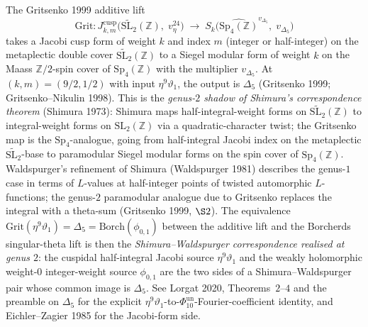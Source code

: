 \begin{remark}
\label{rem:k3e-gritsenko-shimura-shadow}
The Gritsenko 1999 additive lift
\[
 \mathrm{Grit}\colon
 J^{\mathrm{cusp}}_{k,m}\bigl(\widetilde{\mathrm{SL}_2}(\mathbb{Z}),\; v_\eta^{24}\bigr)
 \;\longrightarrow\;
 S_{k}\bigl(\widehat{\mathrm{Sp}_4(\mathbb{Z})}^{v_{\Delta_5}},\; v_{\Delta_5}\bigr)
\]
takes a Jacobi cusp form of weight $k$ and index $m$ (integer or half-integer) on the
metaplectic double cover $\widetilde{\mathrm{SL}_2}(\mathbb{Z})$ to a Siegel modular
form of weight $k$ on the Maass $\mathbb{Z}/2$-spin cover of $\mathrm{Sp}_4(\mathbb{Z})$
with the multiplier $v_{\Delta_5}$. At $(k,m) = (9/2, 1/2)$ with input
$\eta^9\vartheta_1$, the output is $\Delta_5$ (Gritsenko 1999; Gritsenko--Nikulin 1998).
This is the \emph{genus-$2$ shadow of Shimura's correspondence theorem} (Shimura 1973):
Shimura maps half-integral-weight forms on $\widetilde{\mathrm{SL}_2}(\mathbb{Z})$ to
integral-weight forms on $\mathrm{SL}_2(\mathbb{Z})$ via a quadratic-character twist; the
Gritsenko map is the $\mathrm{Sp}_4$-analogue, going from half-integral Jacobi index
on the metaplectic $\widetilde{\mathrm{SL}_2}$-base to paramodular Siegel modular forms
on the spin cover of $\mathrm{Sp}_4(\mathbb{Z})$. Waldspurger's refinement of Shimura
(Waldspurger 1981) describes the genus-$1$ case in terms of $L$-values at half-integer
points of twisted automorphic $L$-functions; the genus-$2$ paramodular analogue due to
Gritsenko replaces the integral with a theta-sum (Gritsenko 1999, $\S 2$). The
equivalence $\mathrm{Grit}(\eta^9\vartheta_1) = \Delta_5 = \mathrm{Borch}(\phi_{0,1})$
between the additive lift and the Borcherds singular-theta lift is then the
\emph{Shimura--Waldspurger correspondence realised at genus $2$}: the cuspidal
half-integral Jacobi source $\eta^9\vartheta_1$ and the weakly holomorphic weight-$0$
integer-weight source $\phi_{0,1}$ are the two sides of a Shimura--Waldspurger pair
whose common image is $\Delta_5$. See Lorgat 2020, Theorems~$2$--$4$ and the preamble
on $\Delta_5$ for the explicit $\eta^9\vartheta_1$-to-\(\Phi_{10}^{\mathrm{un}}\)-Fourier-coefficient
identity, and Eichler--Zagier 1985 for the Jacobi-form side.
\end{remark}


